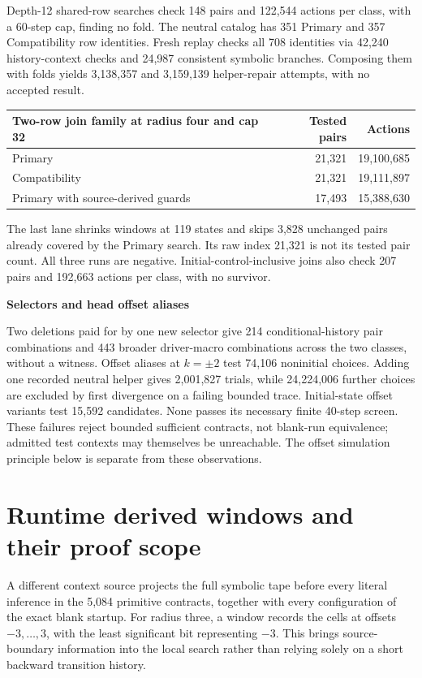 \documentclass[11pt,letterpaper]{article}
\begin{document}
Depth-12 shared-row searches check 148 pairs and 122,544 actions per class,
with a 60-step cap, finding no fold. The neutral catalog has 351 Primary and
357 Compatibility row identities. Fresh replay checks all 708 identities via
42,240 history-context checks and 24,987 consistent symbolic branches.
Composing them with folds yields 3,138,357 and 3,159,139 helper-repair attempts,
with no accepted result.
\begin{center}\small\begin{tabular}{lrr}\toprule
Two-row join family at radius four and cap 32 & Tested pairs & Actions\\\midrule
Primary & 21,321 & 19,100,685\\
Compatibility & 21,321 & 19,111,897\\
Primary with source-derived guards & 17,493 & 15,388,630\\\bottomrule
\end{tabular}\end{center}
The last lane shrinks windows at 119 states and skips 3,828 unchanged pairs
already covered by the Primary search. Its raw index 21,321 is not its tested
pair count. All three runs are negative. Initial-control-inclusive joins also
check 207 pairs and 192,663 actions per class, with no survivor.

\medskip\noindent\textbf{Selectors and head offset aliases}\par
Two deletions paid for by one new selector give 214 conditional-history pair
combinations and 443 broader driver-macro combinations across the two classes,
without a witness. Offset aliases at $k=\pm2$ test 74,106 noninitial choices.
Adding one recorded neutral helper gives 2,001,827 trials, while 24,224,006
further choices are excluded by first divergence on a failing bounded trace.
Initial-state offset variants test 15,592 candidates. None passes its necessary
finite 40-step screen. These failures reject bounded sufficient contracts,
not blank-run equivalence; admitted test contexts may themselves be unreachable.
The offset simulation principle below is separate from these observations.
\clearpage
\section{Runtime derived windows and their proof scope}
A different context source projects the full symbolic tape before every
literal inference in the 5,084 primitive contracts, together with every
configuration of the exact blank startup. For radius three, a window records
the cells at offsets $-3,\ldots,3$, with the least significant bit representing
$-3$. This brings source-boundary information into the local search rather
than relying solely on a short backward transition history.
\end{document}
